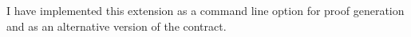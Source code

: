 \documentclass[12pt,a4paper,twoside,openright]{report}
\begin{document}
I have implemented this extension as a command line option for proof generation and as an alternative version of the contract.





%
%
%
%
%
%
%
%
\end{document}
